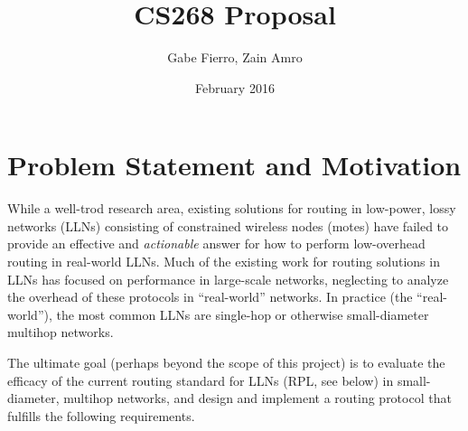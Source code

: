 \documentclass[10pt]{article}
\title{CS268 Proposal}
\author{Gabe Fierro, Zain Amro}
\date{February 2016}
\begin{document}
\setlength{\droptitle}{-8em}

\maketitle

\section{Problem Statement and Motivation}


While a well-trod research area, existing solutions for routing in low-power,
lossy networks (LLNs) consisting of constrained wireless nodes (motes) have
failed to provide an effective and \emph{actionable} answer for how to perform
low-overhead routing in real-world LLNs. Much of the existing work for routing
solutions in LLNs has focused on performance in large-scale networks,
neglecting to analyze the overhead of these protocols in ``real-world''
networks. In practice (the ``real-world''), the most common LLNs are single-hop
or otherwise small-diameter multihop networks.

The ultimate goal (perhaps beyond the scope of this project) is to evaluate the
efficacy of the current routing standard for LLNs (RPL, see below) in
small-diameter, multihop networks, and design and implement a routing protocol
that fulfills the following requirements.
\end{document}
